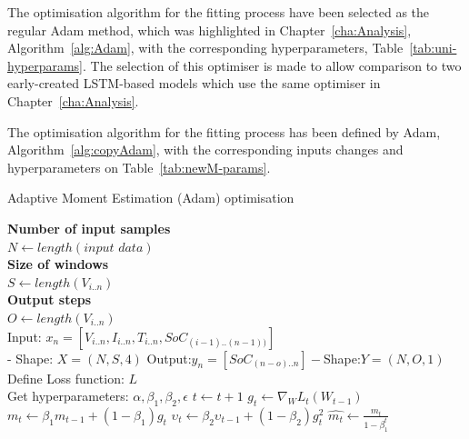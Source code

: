 %
%
{The optimisation algorithm for the fitting process have been selected as the regular Adam method, which was highlighted in Chapter~\ref{cha:Analysis}, \mbox{Algorithm~\ref{alg:Adam}}, with the corresponding hyperparameters, \mbox{Table~\ref{tab:uni-hyperparams}}.
The selection of this optimiser is made to allow comparison to two early-created LSTM-based models which use the same optimiser in Chapter~\ref{cha:Analysis}.}
{The optimisation algorithm for the fitting process has been defined by Adam, \mbox{Algorithm~\ref{alg:copyAdam}}, with the corresponding inputs changes and hyperparameters on \mbox{Table~\ref{tab:newM-params}}. %
\begin{algorithm}
    \caption{Adaptive Moment Estimation (Adam) optimisation}
    \begin{algorithmic}[1]
        \STATE \textbf{Number of input samples} \\ $N\gets length(\textit{input data})$\\
        \STATE \textbf{Size of windows} \\ $S\gets length(V_{i..n})$\\
        \STATE \textbf{Output steps} \\ $O\gets length(V_{i..n})$\\
        \STATE Input: $x_n = [V_{i..n}, I_{i..n}, T_{i..n}, SoC_{(i-1)..(n-1))}]$ \\
        - Shape: $X = (N, S, 4)$
        \STATE Output:$y_n = [SoC_{(n-o)..n}] - $Shape:$Y = (N, O, 1)$
        \STATE Define Loss function: $L$ \\
                Get hyperparameters: $\alpha, \beta_1, \beta_2, \epsilon$
        \STATE $t \gets t+1$
        \STATE $g_t \gets \nabla_W L_t (W_{t-1})$ 
        \STATE $m_t \gets \beta_1 m_{t-1}+(1-\beta_1) g_t $ 
        \STATE $\upsilon_t \gets \beta_2 \upsilon_{t-1}+ \left(1-\beta_2 \right)g^2_t $ 
        \STATE $\hat{m_t} \gets \frac{m_t}{1-\beta^t_1}$ 

\end{algorithmic}
\end{algorithm}}
